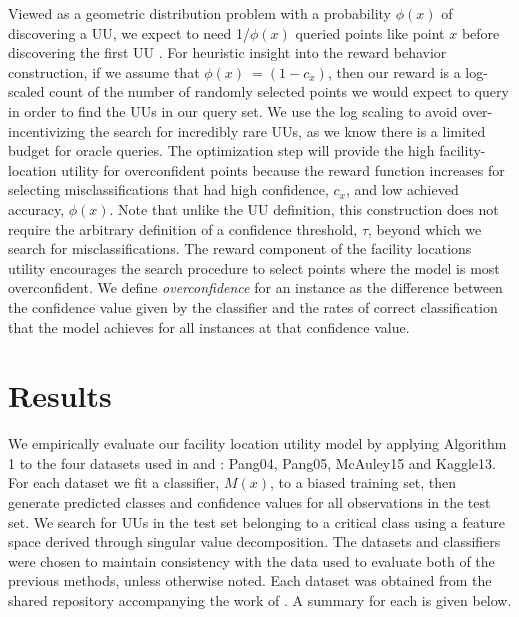 \documentclass[letterpaper]{article} %
\begin{document}
Viewed as a geometric distribution problem with a probability $\phi(x)$ of discovering a UU, we expect to need 1/$\phi(x)$ queried points like point $x$ before discovering the first UU \citep{casella2002statistical}.  For heuristic insight into the reward behavior construction, if we assume that   $\phi(x) ~= (1-c_x )$, then our reward is a log-scaled count of the number of randomly selected points we would expect to query in order to find the UUs in our query set. We use the log scaling to avoid over-incentivizing the search for incredibly rare UUs, as we know there is a limited budget for oracle queries. The optimization step will provide the high facility-location utility for overconfident points because the reward function increases for selecting misclassifications that had high confidence, $c_x$, and low achieved accuracy, $\phi(x)$. Note that unlike the UU definition, this construction does not require the arbitrary definition of a confidence threshold, $\tau$, beyond which we search for misclassifications. The reward component of the facility locations utility encourages the search procedure to select points where the model is most overconfident. We define \textit{overconfidence} for an instance as the difference between the confidence value given by the classifier and the rates of correct classification that the model achieves for all instances at that confidence value. 



\section{Results}

We empirically evaluate our facility location utility model by applying Algorithm 1 to the four datasets used in \cite{Lakkaraju2016} and \cite{Bansal2018}: Pang04, Pang05, McAuley15 and Kaggle13.  For each dataset we fit a classifier, $M(x)$, to a biased training set, then generate predicted classes and confidence values for all observations in the test set.  We search for UUs in the test set belonging to a critical class using a feature space derived through singular value decomposition.  The datasets and classifiers were chosen to maintain consistency with the data used to evaluate both of the previous methods, unless otherwise noted.  Each dataset was obtained from the shared repository accompanying the work of \cite{Bansal2018}.  A summary for each is given below.    
\end{document}
